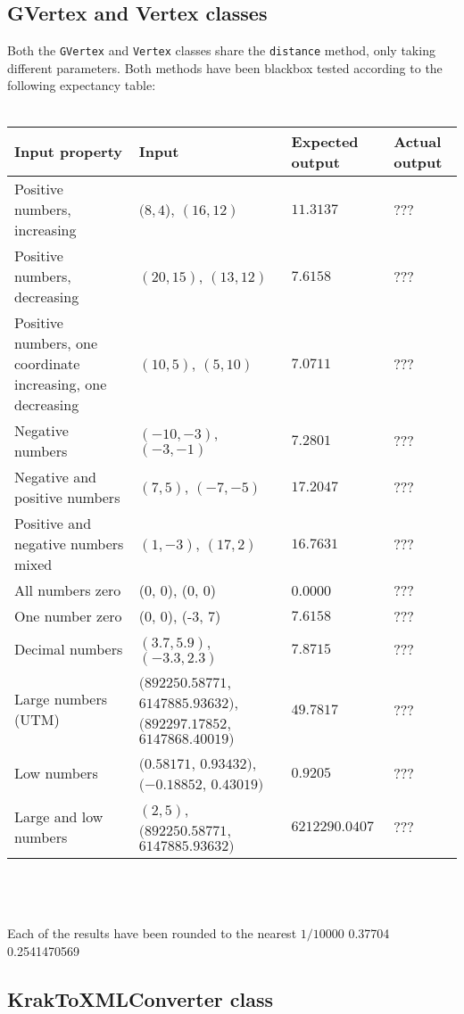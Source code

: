 \documentclass[a4paper,11pt]{article}
\begin{document}
\subsection{GVertex and Vertex classes}
Both the \texttt{GVertex} and \texttt{Vertex} classes share the \texttt{distance} method, only taking different parameters. Both methods have been blackbox tested according to the following expectancy table: \\ \\
\begin{tabular}{ p{3.5cm} | p{2.5cm} | p{2.5cm} | p{2.5cm} }
	Input property & Input & Expected output & Actual output \\
	\hline
	Positive numbers, increasing & $(8,4$), $(16,12)$ & $11.3137$ & ??? \\
	Positive numbers, decreasing & $(20,15)$, $(13,12)$ & $7.6158$ & ??? \\
	Positive numbers, one coordinate increasing, one decreasing & $(10, 5)$, $(5, 10)$ & $7.0711$ & ??? \\
	Negative numbers & $(-10, -3)$, $(-3, -1)$ & $7.2801$ & ??? \\
	Negative and positive numbers & $(7, 5)$, $(-7, -5)$ & $17.2047$ & ??? \\
	Positive and negative numbers mixed & $(1, -3)$, $(17, 2)$ & $16.7631$ & ??? \\
	All numbers zero & (0, 0), (0, 0) & 0.0000 & ??? \\
	One number zero & (0, 0), (-3, 7) & $7.6158$ & ??? \\
	Decimal numbers & $(3.7, 5.9)$, $(-3.3, 2.3)$ & $7.8715$ & ??? \\
	Large numbers (UTM) & $(892250.58771$, $6147885.93632)$, $(892297.17852$, $6147868.40019)$ & $49.7817$ & ??? \\
	Low numbers & $(0.58171$, $0.93432)$, $(-0.18852$, $0.43019)$ & $0.9205$ & ??? \\
	Large and low numbers & $(2, 5)$, $(892250.58771$, $6147885.93632)$ & $6212290.0407$ & ???
\end{tabular}
\\ \\ \\
Each of the results have been rounded to the nearest $1/10000$
0.37704
0.2541470569
\pagebreak
\subsection{KrakToXMLConverter class}

\pagebreak
\end{document}
